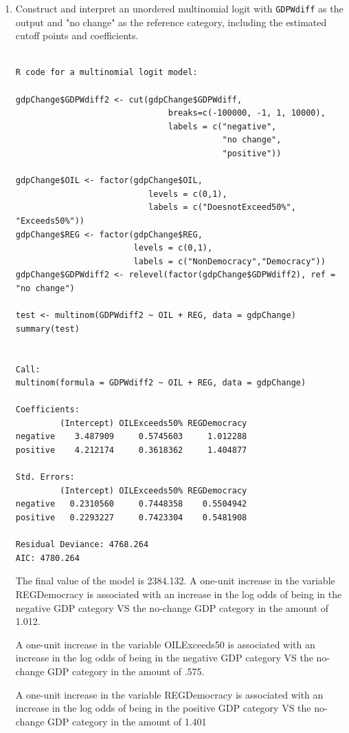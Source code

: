 \documentclass[12pt,letterpaper]{article}
\begin{document}
\begin{enumerate}
	\item Construct and interpret an unordered multinomial logit with \texttt{GDPWdiff} as the output and "no change" as the reference category, including the estimated cutoff points and coefficients.
\begin{verbatim}

R code for a multinomial logit model:

gdpChange$GDPWdiff2 <- cut(gdpChange$GDPWdiff,
                               breaks=c(-100000, -1, 1, 10000),
                               labels = c("negative",
                                          "no change",
                                          "positive"))

gdpChange$OIL <- factor(gdpChange$OIL,
                           levels = c(0,1),
                           labels = c("DoesnotExceed50%", "Exceeds50%"))
gdpChange$REG <- factor(gdpChange$REG,
                        levels = c(0,1),
                        labels = c("NonDemocracy","Democracy"))
gdpChange$GDPWdiff2 <- relevel(factor(gdpChange$GDPWdiff2), ref = "no change")

test <- multinom(GDPWdiff2 ~ OIL + REG, data = gdpChange)
summary(test)


Call:
multinom(formula = GDPWdiff2 ~ OIL + REG, data = gdpChange)

Coefficients:
         (Intercept) OILExceeds50% REGDemocracy
negative    3.487909     0.5745603     1.012288
positive    4.212174     0.3618362     1.404877

Std. Errors:
         (Intercept) OILExceeds50% REGDemocracy
negative   0.2310560     0.7448358    0.5504942
positive   0.2293227     0.7423304    0.5481908

Residual Deviance: 4768.264 
AIC: 4780.264 

\end{verbatim}


The final value of the model is 2384.132.
A one-unit increase in the variable REGDemocracy is associated with an increase in the log odds of being in the negative GDP category VS the no-change GDP category in the amount of 1.012.


A one-unit increase in the variable OILExceeds50 is associated with an increase in the log odds of being in the negative GDP category VS the no-change GDP category in the amount of .575.


A one-unit increase in the variable REGDemocracy is associated with an increase in the log odds of being in the positive GDP category VS the no-change GDP category in the amount of 1.401


\end{enumerate}
\end{document}
